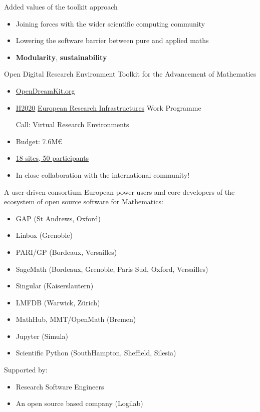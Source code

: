 \documentclass{beamer}
\begin{document}
\begin{frame}{Added values of the toolkit approach}
  \begin{itemize}
  \item Joining forces with the wider scientific computing community
  \item Lowering the software barrier between pure and applied maths
  \item \textbf{Modularity}, \textbf{sustainability}
  \end{itemize}
\end{frame}


\begin{frame}{Open Digital Research Environment Toolkit for the
    Advancement of Mathematics}

  \begin{itemize}
  \item \href{OpenDreamKit.org}{OpenDreamKit.org}
  \item \href{https://ec.europa.eu/programmes/horizon2020/}{H2020}
    \href{https://ec.europa.eu/programmes/horizon2020/en/h2020-section/european-research-infrastructures-including-e-infrastructures}{European
      Research Infrastructures} Work Programme

    Call: Virtual Research Environments

  \item Budget: 7.6M\euro

  \item \href{http://opendreamkit.org/partners}{18 sites, 50 participants}
  \item In close collaboration with the international community!
  \end{itemize}
\end{frame}

\begin{frame}{A user-driven consortium}
  European power users and core developers of the ecosystem of open
  source software for Mathematics:
  \begin{itemize}
  \item GAP (St Andrews, Oxford)
  \item Linbox (Grenoble)
  \item PARI/GP (Bordeaux, Versailles)
  \item SageMath (Bordeaux, Grenoble, Paris Sud, Oxford, Versailles)
  \item Singular (Kaiserslautern)
  \item LMFDB (Warwick, Zürich)
  \item MathHub, MMT/OpenMath (Bremen)
  \item Jupyter (Simula)
  \item Scientific Python (SouthHampton, Sheffield, Silesia)
  \end{itemize}

  \begin{block}{Supported by:}
    \begin{itemize}
    \item Research Software Engineers
    \item An open source based company (Logilab)
    \end{itemize}
  \end{block}
\end{frame}
\end{document}
